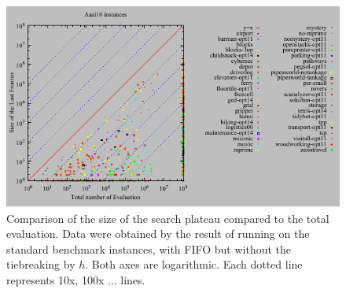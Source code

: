 \begin{figure}[htb]
 \centering
 \includegraphics{tables/aaai16-front-vs-evaluated.pdf}
 \caption{Comparison of the size of the search plateau compared to the total evaluation. Data were obtained by the result of running \astar on the standard benchmark instances, with FIFO but without the tiebreaking by $h$. Both axes are logarithmic. Each dotted line represents 10x, 100x ... lines.}
 \label{plateau-f}
\end{figure}

% 

